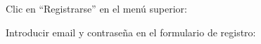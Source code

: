 \documentclass[12pt, spanish]{article}
\begin{document}
    \begin{steps}

        \item Clic en ``Registrarse'' en el menú superior:

            \medskip
            \begin{minipage}[t]{\linewidth}
            \raggedright
        \end{minipage}

        \item Introducir email y contraseña en el formulario de registro:

            \medskip
            \begin{minipage}[t]{\linewidth}
            \raggedright
        \end{minipage}


\end{steps}
\end{document}
